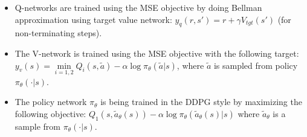 \begin{itemize}
	\item Q-networks are trained using the MSE objective by doing Bellman approximation using target value network: \begin{math}y_q(r,s') = r + \gamma V_{tgt}(s')\end{math}
	(for non-terminating steps).
	\item The V-network is trained using the MSE objective with the following target:
	\begin{math}y_v(s) = \min\limits_{i=1,2}Q_i(s,\tilde{a}) - \alpha \log \pi_\theta(\tilde{a}|s)\end{math}, where \begin{math}\tilde{a}\end{math} is
	sampled from policy \begin{math}\pi_\theta(\cdot|s)\end{math}.
	\item The policy network \begin{math}\pi_\theta\end{math} is being trained in the DDPG style by maximizing the following objective:
	\begin{math}Q_1(s,\tilde{a}_\theta(s)) - \alpha \log \pi_\theta(\tilde{a}_\theta(s)|s)\end{math}
	where \begin{math}\tilde{a}_\theta\end{math} is a sample from
	\begin{math}\pi_\theta(\cdot|s)\end{math}.
\end{itemize}



